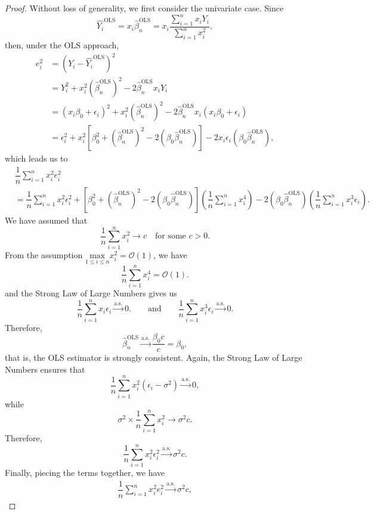 \documentclass[12pt]{article}
\newcommand{\sumin}{\sum_{i=1}^n} %
\newcommand{\dn}{\dfrac{1}{n}} %
\newcommand{\CONV}[1]{\stackrel{\text{#1}}{\longrightarrow}} %
\begin{document}
\begin{proof}
	Without loss of generality, we first consider the univariate case. Since 
	$$
	\widehat{Y_i}^{\text{OLS}} 
	= x_i \widehat{\beta}_n^{\text{OLS}}
	= x_i \dfrac {\sumin x_i Y_i} 
		{\sumin x_i^2},
	$$
	then, under the OLS approach,
	\begin{align*}
	e_i^2
	&= \left( Y_i - \widehat{Y_i}^{\text{OLS}} \right)^2 \\
	&= Y_i^2 
		+ x_i^2 \left( \widehat{\beta}_n^{\text{OLS}} \right)^2
		- 2 \widehat{\beta}_n^{\text{OLS}} x_i Y_i \\
	&= \left( x_i \beta_0 + \epsilon_i \right)^2
		+ x_i^2 \left( \widehat{\beta}_n^{\text{OLS}} \right)^2
		- 2 \widehat{\beta}_n^{\text{OLS}} x_i (x_i \beta_0 + \epsilon_i) \\
	&= \epsilon_i^2 
		+ x_i^2 \left[ 
					 \beta_0^2 + 
					 \left( \widehat{\beta}_n^{\text{OLS}} \right)^2
					 - 2 \left( \beta_0 \widehat{\beta}_n^{\text{OLS}} \right)
				\right]
		- 2 x_i \epsilon_i \left(
							\beta_0 \widehat{\beta}_n^{\text{OLS}}
							\right), 
	\end{align*}
	which leads us to 
	\begin{align*}
	&\dn \sumin x_i^2 e_i^2 \\
	&= \dn \sumin x_i^2 \epsilon_i^2
		+ \left[ 
				\beta_0^2 + 
				\left( \widehat{\beta}_n^{\text{OLS}} \right)^2
				- 2 \left( \beta_0 \widehat{\beta}_n^{\text{OLS}} \right)
		  \right] 
		  \left( \dn \sumin x_i^4 \right)
		- 2 \left( \beta_0 \widehat{\beta}_n^{\text{OLS}} \right)
			\left( \dn \sumin x_i^3 \epsilon_i \right).  
	\end{align*}
	We have assumed that 
	$$
	\dn \sumin x_i^2 \to c \quad \text{for some} \,\, c > 0.
	$$
	From the assumption $\underset{1 \leq i \leq n}{\text{max}} x_i^2 = \mathcal{O} (1)$, we have 
	$$
	\dn \sumin x_i^4 = \mathcal{O} (1).
	$$
	and the Strong Law of Large Numbers gives us 
	$$
	\dn \sumin x_i \epsilon_i \CONV{a.s.} 0.
	\qquad \text{and} \qquad
	\dn \sumin x_i^3 \epsilon_i \CONV{a.s.} 0.
	$$
	Therefore,
	$$
	\widehat{\beta}_n^{\text{OLS}} 
	\CONV{a.s.}
	\dfrac{\beta_0 c}{c}
	= \beta_0, 
	$$
	that is, the OLS estimator is strongly consistent. 
	Again, the Strong Law of Large Numbers ensures that 
	$$
	\dn \sumin x_i^2 (\epsilon_i - \sigma^2) \CONV{a.s.} 0,
	$$
	while 
	$$
	\sigma^2 \times \dn \sumin x_i^2 \to \sigma^2 c.
	$$
	Therefore,
	$$
	\dn \sumin x_i^2 \epsilon_i^2 \CONV{a.s.} \sigma^2 c.
	$$
	Finally, piecing the terms together, we have
	\begin{align*}
	\dn \sumin x_i^2 e_i^2 \CONV{a.s.} \sigma^2 c,

\end{align*}
\end{proof}
\end{document}
